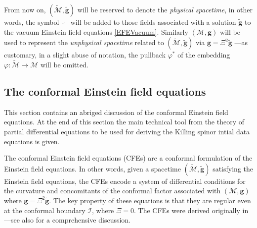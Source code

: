 \documentclass[10pt,a4paper]{article}
\theoremstyle{plain}
\def\bmg{{\bm g}}
\begin{document}
\medskip

From now on, $(\tilde{\mathcal{M}},\tilde{\bmg})$ will be reserved to
denote the \emph{physical spacetime}, in other words, the symbol
$\tilde{ \quad}$ will be added to those fields associated with a
solution $\tilde{\bmg}$ to the vacuum Einstein field equations
\eqref{EFEVacuum}.  Similarly $(\mathcal{M},\bmg)$ will be used to
represent the \emph{unphysical spacetime} related to
$(\tilde{\mathcal{M}},\tilde{\bmg})$ via $\bmg=\Xi^2\tilde{\bmg}$
---as customary, in a slight abuse of notation, the pullback $\varphi^*$ of the
 embedding
$\varphi:
\tilde{\mathcal{M}}\rightarrow\mathcal{M}$ will be omitted.



\subsection{The  conformal Einstein field equations}
\label{Sec:CFEs}


\medskip

This section contains an abriged discussion of the conformal Einstein
field equations.  At the end of this section the main technical
tool from the theory of partial
differential equations to be used for deriving the Killing spinor
intial data equations is given.

\medskip
 

The conformal Einstein field equations (CFEs) are a conformal
formulation of the Einstein field equations. In other words, given a
spacetime $(\tilde{\mathcal{M}},\tilde{\bmg})$ satisfying the Einstein
field equations, the CFEs
encode a system of differential conditions for the curvature and
concomitants of the conformal factor associated with
$(\mathcal{M},\bmg)$ where $\bmg=\Xi^2\tilde{\bmg}$. The key property
of these equations is that they are regular even at the conformal
boundary $\mathscr{I}$, where $\Xi=0$.  The CFEs were derived originally
in \cite{Fri81a} ---see also \cite{CFEbook} for a
comprehensive discussion.

\medskip
\end{document}

